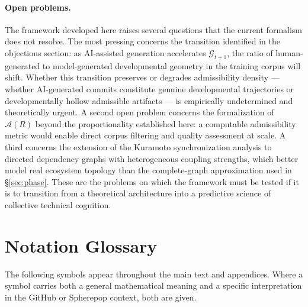 \documentclass[11pt]{article}
\begin{document}
\paragraph{Open problems.}
The framework developed here raises several questions that the current
formalism does not resolve. The most pressing concerns the transition
identified in the objections section: as AI-assisted generation accelerates
$\mathcal{G}_{t+1}$, the ratio of human-generated to model-generated
developmental geometry in the training corpus will shift. Whether this
transition preserves or degrades admissibility density --- whether AI-generated
commits constitute genuine developmental trajectories or developmentally
hollow admissible artifacts --- is empirically undetermined and theoretically
urgent. A second open problem concerns the formalization of $\mathcal{A}(R)$
beyond the proportionality established here: a computable admissibility metric
would enable direct corpus filtering and quality assessment at scale. A third
concerns the extension of the Kuramoto synchronization analysis to directed
dependency graphs with heterogeneous coupling strengths, which better model
real ecosystem topology than the complete-graph approximation used in
\S\ref{sec:phase}. These are the problems on which the framework must be
tested if it is to transition from a theoretical architecture into a
predictive science of collective technical cognition.


\section*{Notation Glossary}
\label{sec:notation}

The following symbols appear throughout the main text and appendices. Where a
symbol carries both a general mathematical meaning and a specific interpretation
in the GitHub or Spherepop context, both are given.
\end{document}
